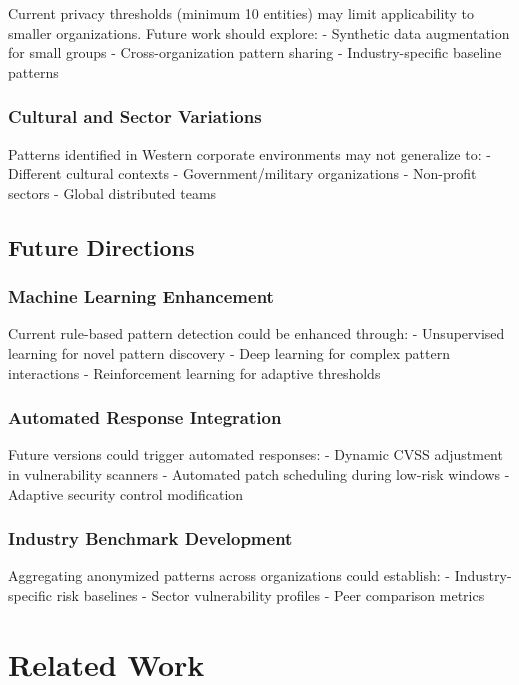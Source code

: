 \documentclass[11pt,a4paper]{article}
\begin{document}
Current privacy thresholds (minimum 10 entities) may limit applicability to smaller organizations. Future work should explore:
- Synthetic data augmentation for small groups
- Cross-organization pattern sharing
- Industry-specific baseline patterns

\subsubsection{Cultural and Sector Variations}

Patterns identified in Western corporate environments may not generalize to:
- Different cultural contexts
- Government/military organizations
- Non-profit sectors
- Global distributed teams

\subsection{Future Directions}

\subsubsection{Machine Learning Enhancement}

Current rule-based pattern detection could be enhanced through:
- Unsupervised learning for novel pattern discovery
- Deep learning for complex pattern interactions
- Reinforcement learning for adaptive thresholds

\subsubsection{Automated Response Integration}

Future versions could trigger automated responses:
- Dynamic CVSS adjustment in vulnerability scanners
- Automated patch scheduling during low-risk windows
- Adaptive security control modification

\subsubsection{Industry Benchmark Development}

Aggregating anonymized patterns across organizations could establish:
- Industry-specific risk baselines
- Sector vulnerability profiles
- Peer comparison metrics

\section{Related Work}
\end{document}

